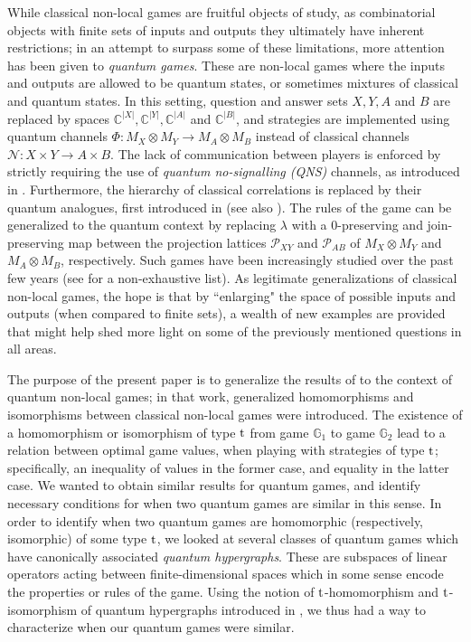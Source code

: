 \documentclass[11pt]{amsart}
\newcommand{\cl}[1]{\mathcal{#1}}
\newcommand{\bb}[1]{\mathbb{#1}}
\begin{document}
While classical non-local games are fruitful objects of study, as combinatorial objects with finite sets of inputs and outputs they ultimately have inherent restrictions; in an attempt to surpass some of these limitations, more attention has been given to \textit{quantum games}. These are non-local games where the inputs and outputs are allowed to be quantum states, or sometimes mixtures of classical and quantum states. In this setting, question and answer sets $X, Y, A$ and $B$ are replaced by spaces $\bb{C}^{|X|}, \bb{C}^{|Y|}, \bb{C}^{|A|}$ and $\bb{C}^{|B|}$, and strategies are implemented using quantum channels $\Phi: M_{X}\otimes M_{Y}\rightarrow M_{A}\otimes M_{B}$ instead of classical channels $\mathcal{N}: X\times Y\rightarrow A\times B$. The lack of communication between players is enforced by strictly requiring the use of \textit{quantum no-signalling (QNS)} channels, as introduced in \cite{dw}. Furthermore, the hierarchy of classical correlations is replaced by their quantum analogues, first introduced in \cite{tt} (see also \cite{bks}). The rules of the game can be generalized to the quantum context by replacing $\lambda$ with a $0$-preserving and join-preserving map between the projection lattices $\cl{P}_{XY}$ and $\cl{P}_{AB}$ of $M_{X}\otimes M_{Y}$ and $M_{A}\otimes M_{B}$, respectively. Such games have been increasingly studied over the past few years (see \cite{synch_bhtt, bhtt, cjpp, rv, tt} for a non-exhaustive list). As legitimate generalizations of classical non-local games, the hope is that by ``enlarging" the space of possible inputs and outputs (when compared to finite sets), a wealth of new examples are provided that might help shed more light on some of the previously mentioned questions in all areas. 

The purpose of the present paper is to generalize the results of \cite{gt_one} to the context of quantum non-local games; in that work, generalized homomorphisms and isomorphisms between classical non-local games were introduced. The existence of a homomorphism or isomorphism of type ${\rm t}$ from game $\bb{G}_{1}$ to game $\bb{G}_{2}$ lead to a relation between optimal game values, when playing with strategies of type ${\rm t}$; specifically, an inequality of values in the former case, and equality in the latter case. We wanted to obtain similar results for quantum games, and identify necessary conditions for when two quantum games are similar in this sense. In order to identify when two quantum games are homomorphic (respectively, isomorphic) of some type ${\rm t}$, we looked at several classes of quantum games which have canonically associated \textit{quantum hypergraphs}. These are subspaces of linear operators acting between finite-dimensional spaces which in some sense encode the properties or rules of the game. Using the notion of ${\rm t}$-homomorphism and ${\rm t}$-isomorphism of quantum hypergraphs introduced in \cite{gt_two}, we thus had a way to characterize when our quantum games were similar. 
\end{document}
